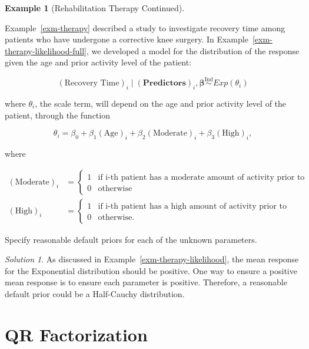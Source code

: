 \documentclass[
  letterpaper,
  DIV=11,
  numbers=noendperiod]{scrreprt}
\theoremstyle{definition}
\theoremstyle{plain}
\theoremstyle{definition}
\newtheorem{example}{Example}[chapter]
\theoremstyle{remark}
\newtheorem*{solution}{Solution}
\begin{document}
\begin{example}[Rehabilitation Therapy
Continued]\protect\hypertarget{exm-therapy-prior}{}\label{exm-therapy-prior}

Example~\ref{exm-therapy} described a study to investigate recovery time
among patients who have undergone a corrective knee surgery. In
Example~\ref{exm-therapy-likelihood-full}, we developed a model for the
distribution of the response given the age and prior activity level of
the patient:

\[(\text{Recovery Time})_i \mid (\mathbf{Predictors})_i, \boldsymbol{\beta} \stackrel{\text{Ind}}{\sim}Exp\left(\theta_i\right)\]

where \(\theta_i\), the scale term, will depend on the age and prior
activity level of the patient, through the function

\[\theta_i = \beta_0 + \beta_1 (\text{Age})_i + \beta_2 (\text{Moderate})_i + \beta_3 (\text{High})_i,\]

where

\[
\begin{aligned}
  (\text{Moderate})_i 
    &= \begin{cases} 1 & \text{if i-th patient has a moderate amount of activity prior to surgery} \\ 0 & \text{otherwise} \end{cases} \\
  (\text{High})_i
    &= \begin{cases} 1 & \text{if i-th patient has a high amount of activity prior to surgery} \\ 0 & \text{otherwise}. \end{cases}
\end{aligned}
\]

Specify reasonable default priors for each of the unknown parameters.

\end{example}

\begin{solution}

As discussed in Example~\ref{exm-therapy-likelihood}, the mean response
for the Exponential distribution should be positive. One way to ensure a
positive mean response is to ensure each parameter is positive.
Therefore, a reasonable default prior could be a Half-Cauchy
distribution.

\end{solution}

\hypertarget{sec-qr-factorization}{%
\chapter{QR Factorization}\label{sec-qr-factorization}}
\end{document}
